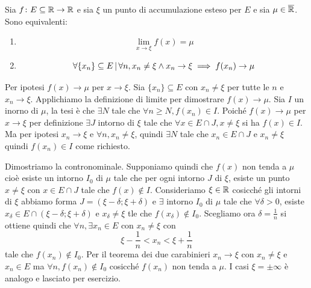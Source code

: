 \documentclass[a4paper]{article}
\begin{document}
\begin{radioactive}
\begin{snippettheorem}{}
    Sia \(f \colon E \subseteq \mathbb{R} \to \mathbb{R}\)
    e sia \(\xi\) un punto di accumulazione esteso per \(E\) e sia \(\mu \in \overline{\mathbb{R}}\).
    Sono equivalenti:
    \begin{enumerate}
        \item \[
            \lim_{x\to\xi} f(x) = \mu
        \]
        \item \[
            \forall \{x_n\} \subseteq E \,|\, \forall n, x_n \neq \xi
            \land x_n \to \xi \implies f(x_n) \to \mu
        \]
    \end{enumerate}
\end{snippettheorem}

\begin{snippetproof}{}
    \begin{iffproof}
        \item Per ipotesi \(f(x) \to \mu\) per \(x\to \xi\).
        Sia \(\{x_n\} \subseteq E\) con \(x_n \neq \xi\) per tutte le \(n\)
        e \(x_n \to \xi\). Applichiamo la definizione di limite per dimostrare
        \(f(x) \to \mu\). Sia \(I\) un inorno di \(\mu\), la tesi è che \(\exists N\)
        tale che \(\forall n \geq N, f(x_n) \in I\).
        Poiché \(f(x) \to \mu\) per \(x\to \xi\) per definizione \(\exists J\)
        intorno di \(\xi\) tale che \(\forall x \in E \cap J, x \neq \xi\) si ha
        \(f(x) \in I\).
        Ma per ipotesi \(x_n \to \xi\) e \(\forall n, x_n \neq \xi\),
        quindi \(\exists N\) tale che \(x_n \in E \cap J\) e \(x_n \neq \xi\)
        quindi \(f(x_n) \in I\) come richiesto.
        \item Dimostriamo la contronominale.
        Supponiamo quindi che \(f(x)\) non tenda a \(\mu\)
        cioè esiste un intorno \(I_0\) di \(\mu\) tale che
        per ogni intorno \(J\) di \(\xi\), esiste un punto \(x\neq \xi\)
        con \(x \in E \cap J\) tale che \(f(x) \notin I\).
        Consideriamo \(\xi \in \mathbb{R}\) cosicché gli intorni di \(\xi\) abbiamo forma
        \(J=(\xi - \delta; \xi + \delta)\) e
        \(\exists\) intorno \(I_0\) di \(\mu\) tale che \(\forall \delta > 0\),
        esiste \(x_\delta \in E \cap (\xi - \delta; \xi + \delta)\) e \(x_\delta \neq \xi\)
        tle che \(f(x_\delta) \notin I_0\). Scegliamo ora \(\delta = \frac{1}{n}\)
        si ottiene quindi che \(\forall n, \exists x_n \in E\) con \(x_n \neq \xi\)
        con
        \[
            \xi - \frac{1}{n} < x_n < \xi + \frac{1}{n}
        \]
        tale che \(f(x_n) \notin I_0\).
        Per il teorema dei due carabinieri \(x_n \to \xi\) con \(x_n\neq\xi\)
        e \(x_n \in E\) ma \(\forall n, f(x_n) \notin I_0\)
        cosicché \(f(x_n)\) non tenda a \(\mu\).
        I casi \(\xi = \pm\infty\) è analogo e lasciato per esercizio.
    \end{iffproof}
\end{snippetproof}
\end{radioactive}
\end{document}
